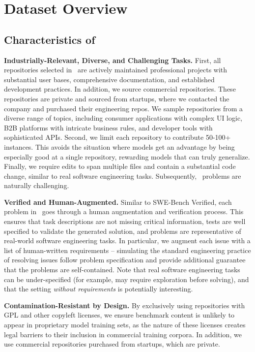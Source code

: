 \section{Dataset Overview}

\subsection{Characteristics of \benchmarkname}

\textbf{Industrially-Relevant, Diverse, and Challenging Tasks.} First, all repositories selected in \benchmarkname~are actively maintained professional projects with substantial user bases, comprehensive documentation, and established development practices. In addition, we source commercial repositories. These repositories are private and sourced from startups, where we contacted the company and purchased their engineering repos. We sample repositories from a diverse range of topics, including consumer applications with complex UI logic, B2B platforms with intricate business rules, and developer tools with sophisticated APIs. Second, we limit each repository to contribute 50-100+ instances. This avoids the situation where models get an advantage by being especially good at a single repository, rewarding models that can truly generalize. Finally, we require edits to span multiple files and contain a substantial code change, similar to real software engineering tasks. Subsequently, \benchmarkname~problems are naturally challenging.


\textbf{Verified and Human-Augmented.} Similar to SWE-Bench Verified, each problem in \benchmarkname~goes through a human augmentation and verification process. This ensures that task descriptions are not missing critical information, tests are well specified to validate the generated solution, and problems are representative of real-world software engineering tasks. In particular, we augment each issue with a list of human-written requirements -- simulating the standard engineering practice of resolving issues follow problem specification and provide additional guarantee that the problems are self-contained. Note that real software engineering tasks can be under-specified (for example, may require exploration before solving), and that the setting \textit{without requirements} is potentially interesting.

\textbf{Contamination-Resistant by Design.} By exclusively using repositories with GPL and other copyleft licenses, we ensure benchmark content is unlikely to appear in proprietary model training sets, as the nature of these licenses creates legal barriers to their inclusion in commercial training corpora. In addition, we use commercial repositories purchased from startups, which are private.

